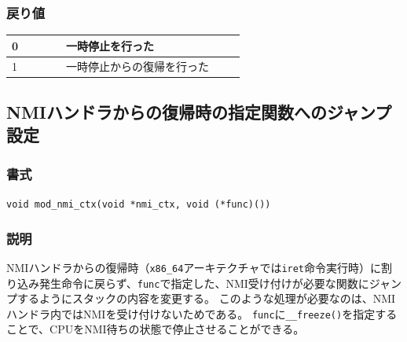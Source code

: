 \documentclass[twoside,11pt,fleqn]{book}
\begin{document}
\subsubsection*{戻り値}{\quad}
\begin{table}[!h]
\footnotesize
\begin{tabular}{|p{0.20\linewidth}|p{0.66\linewidth}|} \hline
0&一時停止を行った\\\hline
1&一時停止からの復帰を行った\\\hline
\end{tabular}
\vspace{-0em}
\end{table}
\FloatBarrier

\subsection{NMIハンドラからの復帰時の指定関数へのジャンプ設定}
\subsubsection*{書式}{\quad} \texttt{void mod\_nmi\_ctx(void *nmi\_ctx, void (*func)())}
\subsubsection*{説明}{\quad} 
NMIハンドラからの復帰時（\texttt{x86\_64}アーキテクチャでは\texttt{iret}命令実行時）に割り込み発生命令に戻らず、\texttt{func}で指定した、NMI受け付けが必要な関数にジャンプするようにスタックの内容を変更する。
このような処理が必要なのは、NMIハンドラ内ではNMIを受け付けないためである。
\texttt{func}に\texttt{\_\_freeze()}を指定することで、CPUをNMI待ちの状態で停止させることができる。
\end{document}
